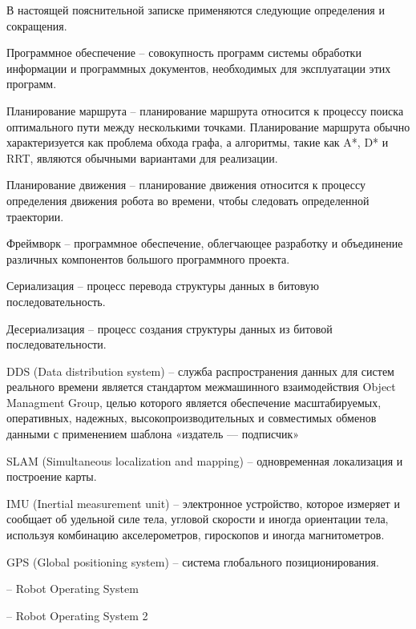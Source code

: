 В настоящей пояснительной записке применяются следующие определения и
сокращения.

Программное обеспечение -- совокупность программ системы обработки
информации и программных документов, необходимых для эксплуатации этих
программ.

Планирование маршрута -- планирование маршрута относится к процессу
поиска оптимального пути между несколькими точками. Планирование маршрута обычно
характеризуется как проблема обхода графа, а алгоритмы, такие как A*, D* и RRT,
являются обычными вариантами для реализации.

Планирование движения -- планирование движения относится к процессу
определения движения робота во времени, чтобы следовать определенной
траектории.

Фреймворк -- программное обеспечение, облегчающее разработку и
объединение различных компонентов большого программного проекта.

Сериализация -- процесс перевода структуры данных в битовую последовательность.

Десериализация -- процесс создания структуры данных из битовой последовательности.

DDS (Data distribution system) -- служба распространения данных для систем
реального времени является стандартом межмашинного взаимодействия Object
Managment Group, целью которого является обеспечение масштабируемых,
оперативных, надежных, высокопроизводительных и совместимых обменов данными с
применением шаблона «издатель — подписчик»

SLAM (Simultaneous localization and mapping) -- одновременная локализация и
построение карты.

IMU (Inertial measurement unit) -- электронное устройство, которое измеряет и
сообщает об удельной силе тела, угловой скорости и иногда ориентации тела,
используя комбинацию акселерометров, гироскопов и иногда магнитометров. 

GPS (Global positioning system) -- система глобального позиционирования.

\ros{} -- Robot Operating System

\rosTwo{} -- Robot Operating System 2
